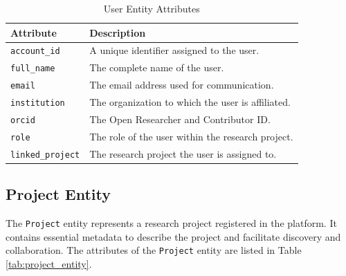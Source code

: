 \documentclass[final]{rc-book-2.14}
\begin{document}
\begin{table}[h]
    \centering
    \renewcommand{\arraystretch}{1.2}
    \caption{User Entity Attributes}
    \label{tab:user_entity}
    \begin{tabularx}{\textwidth}{|l|X|}
        \hline
        \textbf{Attribute}       & \textbf{Description}                              \\ \hline
        \texttt{account\_id}     & A unique identifier assigned to the user.         \\ \hline
        \texttt{full\_name}      & The complete name of the user.                    \\ \hline
        \texttt{email}           & The email address used for communication.         \\ \hline
        \texttt{institution}     & The organization to which the user is affiliated. \\ \hline
        \texttt{orcid}           & The Open Researcher and Contributor ID.           \\ \hline
        \texttt{role}            & The role of the user within the research project. \\ \hline
        \texttt{linked\_project} & The research project the user is assigned to.     \\ \hline
    \end{tabularx}
\end{table}


\subsection{Project Entity}
The \texttt{Project} entity represents a research project registered in the platform. It contains essential metadata to describe the project and facilitate discovery and collaboration. The attributes of the \texttt{Project} entity are listed in Table \ref{tab:project_entity}.
\end{document}
